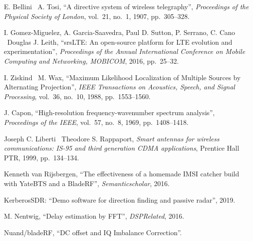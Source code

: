 \documentclass[a4paper,12pt,oneside]{book}%
\begin{document}
\begin{thebibliography}{xx}
	E. Bellini \harvardand\ A. Tosi,
	``{A directive system of wireless telegraphy}'', {\em Proceedings of the
		Physical Society of London}, vol.~21, no.~1, 1907, pp.~305--328.
	
	I. Gomez-Miguelez, A. Garcia-Saavedra, Paul D. Sutton, P. Serrano, C. Cano
	\harvardand\ Douglas J. Leith,
	``{srsLTE: An open-source platform for LTE evolution and experimentation}'',
	{\em Proceedings of the Annual International Conference on Mobile Computing
		and Networking, MOBICOM}, 2016, pp.~25--32.
	
	I. Ziskind \harvardand\ M. Wax,
	``{Maximum Likelihood Localization of Multiple Sources by Alternating
		Projection}'', {\em IEEE Transactions on Acoustics, Speech, and Signal
		Processing}, {vol.~36}, no.~10, 1988, pp.~1553--1560.
	
	J. Capon, ``{High-resolution frequency-wavenumber spectrum analysis}'', 
	{\em Proceedings of the IEEE}, {vol.~57}, no.~8, 1969, pp.~1408--1418.
	
	Joseph C. Liberti \harvardand\ Theodore S. Rappaport, {\em Smart antennas for wireless communications: IS-95 and third generation CDMA applications}, 
	{Prentice Hall PTR}, 1999, pp.~134--134.
	
	Kenneth van Rijsbergen, ``{The
		effectiveness of a homemade IMSI catcher build with YateBTS and a BladeRF}'', {\em Semanticscholar}, 2016.
	
	{KerberosSDR: ``Demo software for direction finding and passive radar''}, 2019.
	
	M. Nentwig, ``{Delay estimation by FFT}'', {\em DSPRelated}, 2016.
	
	{ {Nuand/bladeRF, ``DC offset and IQ Imbalance Correction''.}} 
	

\end{thebibliography}
\end{document}
